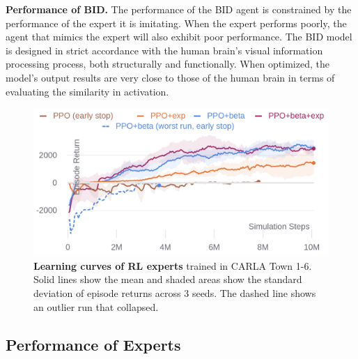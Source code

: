 \textbf{\textsf{Performance of BID.}} The performance of the BID agent is constrained by the performance of the expert it is imitating. When the expert performs poorly, the agent that mimics the expert will also exhibit poor performance. The BID model is designed in strict accordance with the human brain's visual information processing process, both structurally and functionally. When optimized, the model's output results are very close to those of the human brain in terms of evaluating the similarity in activation.


\begin{figure}[t]
	\begin{center}
		\includegraphics[width=\linewidth]{img/rl.png}
	\end{center}
	\vspace{-4ex}
	\caption{\textbf{Learning curves of RL experts }
		trained in CARLA Town 1-6.
		Solid lines show the mean and shaded areas show the standard deviation of episode returns across 3 seeds.
		The dashed line shows an outlier run that collapsed.}
	\vspace{-2ex}
	\label{fig:rl}
\end{figure}

\subsection{Performance of Experts}

